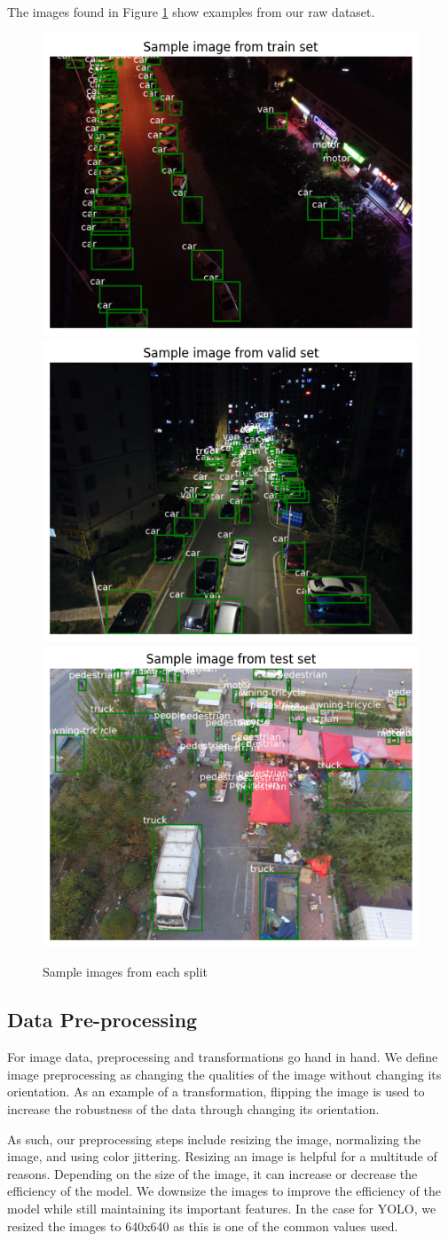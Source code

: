 \documentclass[stu,12pt,floatsintext]{apa7}
\begin{document}
The images found in Figure \ref{fig:sample_images} show examples from our raw dataset.
\begin{figure}
	\centering
	\includegraphics[width=0.33\linewidth]{images/sample_train.png}
	\includegraphics[width=0.33\linewidth]{images/sample_valid.png}
	\includegraphics[width=0.32\linewidth]{images/sample_test.png}
	\caption{Sample images from each split}
	\label{fig:sample_images}
\end{figure}


\subsection{Data Pre-processing}
For image data, preprocessing and transformations go hand in hand. We define image preprocessing as changing the qualities of the image without changing its orientation. As an example of a transformation, flipping the image is used to increase the robustness of the data through changing its orientation.

As such, our preprocessing steps include resizing the image, normalizing the image, and using color jittering. Resizing an image is helpful for a multitude of reasons. Depending on the size of the image, it can increase or decrease the efficiency of the model. We downsize the images to improve the efficiency of the model while still maintaining its important features. In the case for YOLO, we resized the images to 640x640 as this is one of the common values used.
\end{document}
